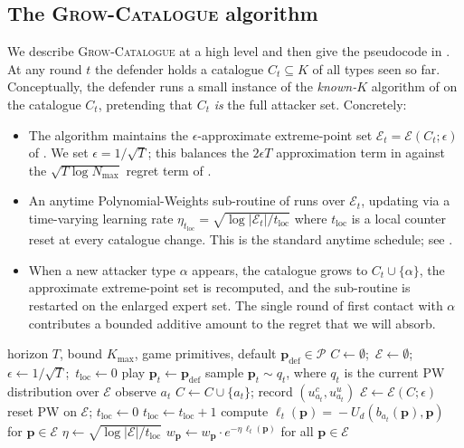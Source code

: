 \documentclass[letterpaper,9pt,twocolumn]{extarticle}
\newcommand{\pvec}{\mathbf{p}}
\newcommand{\cP}{\mathcal{P}}
\newcommand{\cE}{\mathcal{E}}
\newcommand{\Kmax}{K_{\max}}
\newcommand{\Nmax}{N_{\max}}
\theoremstyle{plain}
\theoremstyle{definition}
\theoremstyle{remark}
\begin{document}
\subsection{The \textsc{Grow-Catalogue} algorithm}

We describe \textsc{Grow-Catalogue} at a high level and then give the
pseudocode in . At any round $t$ the defender holds a
catalogue $C_t\subseteq K$ of all types seen so far. Conceptually, the
defender runs a small instance of the \emph{known-$K$} algorithm of
\citet[Sec.~5]{balcan2015} on the catalogue $C_t$, pretending that $C_t$
\emph{is} the full attacker set. Concretely:
\begin{itemize}[leftmargin=1.1em,itemsep=0.05em,topsep=0.2em]
  \item The algorithm maintains the $\epsilon$-approximate extreme-point
  set $\cE_t=\cE(C_t;\epsilon)$ of . We set
  $\epsilon=1/\sqrt T$; this balances the $2\epsilon T$ approximation term
  in  against the $\sqrt{T\log\Nmax}$ regret term of
  .
  \item An anytime Polynomial-Weights sub-routine of
   runs over $\cE_t$, updating via a time-varying
  learning rate $\eta_{t_{\text{loc}}}=\sqrt{\log|\cE_t|/t_{\text{loc}}}$
  where $t_{\text{loc}}$ is a local counter reset at every catalogue
  change. This is the standard anytime schedule; see \citet[Sec.~2]{cesa2006}.
  \item When a new attacker type $\alpha$ appears, the catalogue grows to
  $C_t\cup\{\alpha\}$, the approximate extreme-point set is recomputed,
  and the sub-routine is restarted on the enlarged expert set. The single
  round of first contact with $\alpha$ contributes a bounded additive
  amount to the regret that we will absorb.
\end{itemize}

\begin{algorithm}[t]
\caption{\textsc{Grow-Catalogue} (full information).}
\label{alg:gc}
\begin{algorithmic}[1]
\small
\Require horizon $T$, bound $\Kmax$, game primitives, default $\pvec_{\text{def}}\in\cP$
\State $C\gets\emptyset$;~$\cE\gets\emptyset$;~$\epsilon\gets 1/\sqrt T$;~$t_{\text{loc}}\gets 0$
  \If{$\cE=\emptyset$} \State play $\pvec_t\gets\pvec_{\text{def}}$
  \Else \State sample $\pvec_t\sim q_t$, where $q_t$ is the current PW distribution over $\cE$
  \EndIf
  \State observe $a_t$
   
    \State $C\gets C\cup\{a_t\}$; record $(u_{a_t}^c,u_{a_t}^u)$
    \State $\cE\gets\cE(C;\epsilon)$ 
    \State reset PW on $\cE$; $t_{\text{loc}}\gets 0$
  \Else {}
    \State $t_{\text{loc}}\gets t_{\text{loc}}+1$
    \State compute $\ell_t(\pvec)\!=\!-U_d(b_{a_t}(\pvec),\pvec)$ for $\pvec\in\cE$
    \State $\eta\gets\sqrt{\log|\cE|/t_{\text{loc}}}$
    \State $w_\pvec\gets w_\pvec\cdot e^{-\eta\,\ell_t(\pvec)}$ for all $\pvec\in\cE$
  \EndIf
\EndFor
\end{algorithmic}
\end{algorithm}
\end{document}
